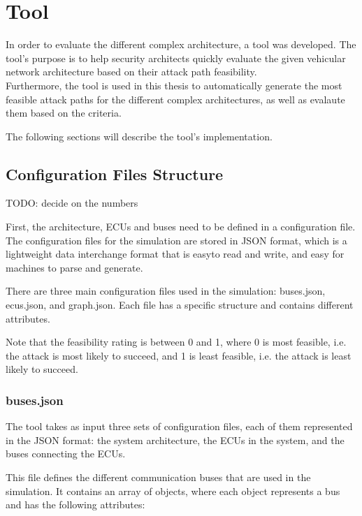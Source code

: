 \chapter{Tool}
\label{chp:tool}

In order to evaluate the different complex architecture, a tool was developed.
The tool's purpose is to help security architects quickly evaluate the given vehicular network architecture based on their \gls{attack path} feasibility.\\
Furthermore, the tool is used in this thesis to automatically generate the most feasible attack paths for the different complex architectures, 
as well as evalaute them based on the criteria.

The following sections will describe the tool's implementation.

\section{Configuration Files Structure}
\label{sec:config}

TODO: decide on the numbers

First, the architecture, ECUs and buses need to be defined in a configuration file.
The configuration files for the simulation are stored in JSON format, which is a lightweight data interchange format that is easyto read and write, and easy for machines to parse and generate.

There are three main configuration files used in the simulation: buses.json, ecus.json, and graph.json.
Each file has a specific structure and contains different attributes.

Note that the feasibility rating is between 0 and 1, where 0 is most feasible, i.e. the attack is most likely to succeed, and 1 is least feasible, i.e. the attack is least likely to succeed.

\subsection{buses.json}
\label{sec:buses}

The tool takes as input three sets of configuration files, each of them represented in the JSON format: 
the system architecture, the ECUs in the system, and the buses connecting the ECUs. 

This file defines the different communication buses that are used in the simulation. 
It contains an array of objects, where each object represents a bus and has the following attributes:

